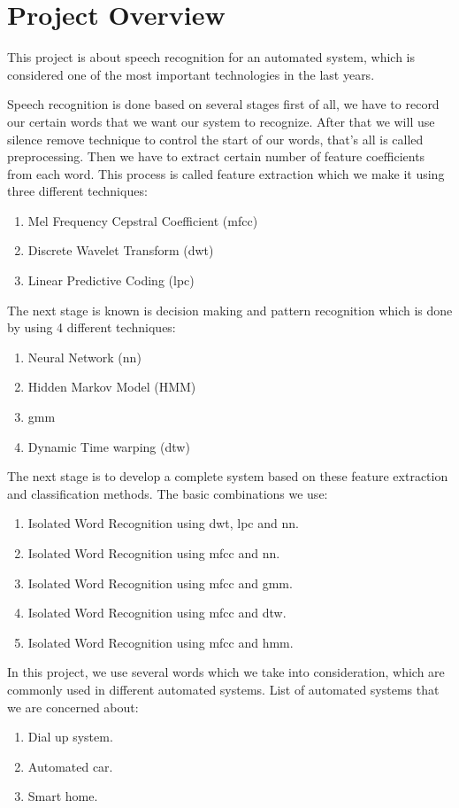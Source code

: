 \documentclass[12pt, a4paper, twoside]{report}
\begin{document}
\section{Project Overview}
This project is about speech recognition for an automated system, which is considered one of the most important technologies in the last years.
\par
Speech recognition is done based on several stages first of all, we have to record our certain words that we want our system to recognize. After that we will use silence remove technique to control the start of our words, that's all is called preprocessing. Then we have to extract certain number of feature coefficients from each word. This process is called feature extraction which we make it using three different techniques:
\begin{enumerate}[noitemsep]
\item Mel Frequency Cepstral Coefficient (\acrshort{mfcc})
\item Discrete Wavelet Transform (\acrshort{dwt})
\item Linear Predictive Coding (\acrshort{lpc})
\end{enumerate}
The next stage is known is decision making and pattern recognition which is done by using 4 different techniques:
\begin{enumerate}[noitemsep]
\item Neural Network (\acrshort{nn})
\item Hidden Markov Model (HMM)
\item \acrfull{gmm}
\item Dynamic Time warping (\acrshort{dtw})
\end{enumerate}
The next stage is to develop a complete system based on these feature extraction and classification methods. The basic combinations we use:
\begin{enumerate}[noitemsep]
\item Isolated Word Recognition using \acrshort{dwt}, \acrshort{lpc} and \acrlong{nn}.
\item Isolated Word Recognition using \acrshort{mfcc} and \acrlong{nn}.
\item Isolated Word Recognition using \acrshort{mfcc} and \acrshort{gmm}.
\item Isolated Word Recognition using \acrshort{mfcc} and \acrshort{dtw}.
\item Isolated Word Recognition using \acrshort{mfcc} and \acrshort{hmm}.
\end{enumerate}
In this project, we use several words which we take into consideration, which are commonly used in different automated systems.
List of automated systems that we are concerned about:
\begin{enumerate}[noitemsep]
\item Dial up system.
\item Automated car.
\item Smart home.
\end{enumerate}
\end{document}
